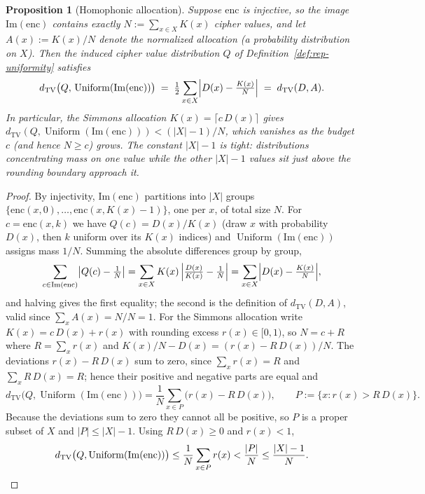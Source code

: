 \documentclass[11pt]{article}
\theoremstyle{definition}
\theoremstyle{plain}
\newtheorem{proposition}[theorem]{Proposition}
\theoremstyle{remark}
\newcommand{\enc}{\mathrm{enc}}
\newcommand{\im}{\mathrm{Im}}
\newcommand{\TV}{d_{\mathrm{TV}}}
\DeclareMathOperator{\Uniform}{Uniform}
\begin{document}
\begin{proposition}[Homophonic allocation]
\label{prop:homophonic}
Suppose $\enc$ is injective, so the image $\im(\enc)$ contains exactly
$N := \sum_{x \in X} K(x)$ cipher values, and let $A(x) := K(x)/N$
denote the normalized allocation (a probability distribution on $X$).
Then the induced cipher value distribution $Q$ of
Definition~\ref{def:rep-uniformity} satisfies
\begin{equation}
\TV\bigl(Q,\, \Uniform(\im(\enc))\bigr)
  \;=\; \tfrac{1}{2} \sum_{x \in X} \Bigl| D(x) - \tfrac{K(x)}{N} \Bigr|
  \;=\; \TV(D, A).
\end{equation}
In particular, the Simmons allocation $K(x) = \lceil c\,D(x) \rceil$
gives $\TV(Q, \Uniform(\im(\enc))) < (|X|-1)/N$, which vanishes as the
budget $c$ (and hence $N \geq c$) grows.  The constant $|X|-1$ is tight:
distributions concentrating mass on one value while the other $|X|-1$
values sit just above the rounding boundary approach it.
\end{proposition}

\begin{proof}
By injectivity, $\im(\enc)$ partitions into $|X|$ groups
$\{\enc(x,0), \ldots, \enc(x,K(x){-}1)\}$, one per $x$, of total size
$N$.  For $c = \enc(x,k)$ we have $Q(c) = D(x)/K(x)$ (draw $x$ with
probability $D(x)$, then $k$ uniform over its $K(x)$ indices) and
$\Uniform(\im(\enc))$ assigns mass $1/N$.  Summing the
absolute differences group by group,
\[
\sum_{c \in \im(\enc)} \bigl|Q(c) - \tfrac1N\bigr|
  = \sum_{x \in X} K(x)\,\Bigl|\tfrac{D(x)}{K(x)} - \tfrac1N\Bigr|
  = \sum_{x \in X} \Bigl| D(x) - \tfrac{K(x)}{N} \Bigr|,
\]
and halving gives the first equality; the second is the definition of
$\TV(D, A)$, valid since $\sum_x A(x) = N/N = 1$.  For the Simmons
allocation write $K(x) = c\,D(x) + r(x)$ with rounding excess
$r(x) \in [0, 1)$, so $N = c + R$ where $R = \sum_x r(x)$ and
$K(x)/N - D(x) = (r(x) - R\,D(x))/N$.  The deviations
$r(x) - R\,D(x)$ sum to zero, since $\sum_x r(x) = R$ and
$\sum_x R\,D(x) = R$; hence their positive and negative parts are
equal and
\[
\TV\bigl(Q, \Uniform(\im(\enc))\bigr)
  = \frac{1}{N} \sum_{x \in P} \bigl(r(x) - R\,D(x)\bigr),
  \qquad P := \{x : r(x) > R\,D(x)\}.
\]
Because the deviations sum to zero they cannot all be positive, so $P$
is a proper subset of $X$ and $|P| \leq |X| - 1$.  Using
$R\,D(x) \geq 0$ and $r(x) < 1$,
\[
\TV\bigl(Q, \Uniform(\im(\enc))\bigr)
  \leq \frac{1}{N} \sum_{x \in P} r(x)
  < \frac{|P|}{N} \leq \frac{|X|-1}{N}. \qedhere
\]
\end{proof}
\end{document}
